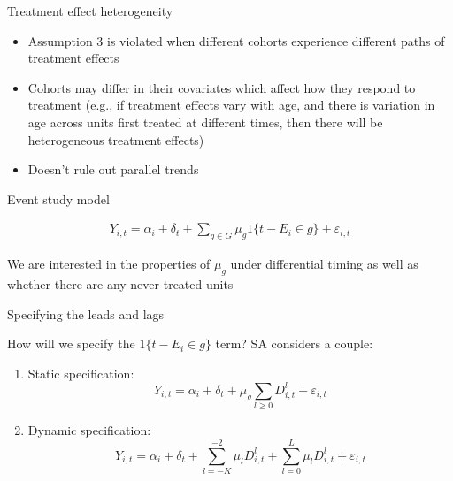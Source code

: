 \documentclass{beamer}
\begin{document}
\begin{frame}{Treatment effect heterogeneity}

\begin{itemize}
\item Assumption 3 is violated when different cohorts experience different paths of treatment effects
\item Cohorts may differ in their covariates which affect how they respond to treatment (e.g., if treatment effects vary with age, and there is variation in age across units first treated at different times, then there will be heterogeneous treatment effects)
\item Doesn't rule out parallel trends
\end{itemize}

\end{frame}

\begin{frame}{Event study model}

\begin{eqnarray*}
Y_{i,t} = \alpha_i + \delta_t + \sum_{g \in G} \mu_g1\{t-E_i \in g \} + \varepsilon_{i,t}
\end{eqnarray*}

\bigskip

We are interested in the properties of $\mu_g$ under differential timing as well as whether there are any never-treated units

\end{frame}


\begin{frame}{Specifying the leads and lags}

How will we specify the $1\{t-E_i \in g \} $ term?  SA considers a couple:

\begin{enumerate}
\item Static specification: $$Y_{i,t} = \alpha_i + \delta_t + \mu_g \sum_{l \geq 0}D^l_{i,t} + \varepsilon_{i,t}$$
\item Dynamic specification: $$Y_{i,t} = \alpha_i + \delta_t + \sum_{l = -K}^{-2} \mu_l D^l_{i,t} + \sum_{l=0}^L\mu_lD^l_{i,t}+ \varepsilon_{i,t}$$
\end{enumerate}

\end{frame}
\end{document}
